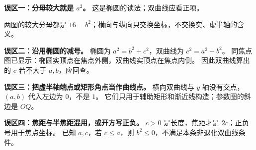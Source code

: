 \begin{trapbox}
\textbf{误区一：分母较大就是 $a^2$。} 这是椭圆的读法；双曲线应看正项。

两图的较大分母都是 $16=b^2$；横向与纵向只交换坐标，不交换实、虚半轴的含义。

\medskip
\textbf{误区二：沿用椭圆的减号。} 椭圆为 $a^2=b^2+c^2$，双曲线为 $c^2=a^2+b^2$。
同焦点图已显示：椭圆实顶点在焦点外侧，双曲线实顶点在焦点内侧。
因此双曲线算出的 $c$ 若不大于 $a,b$，应回查。

\medskip
\textbf{误区三：把虚半轴端点或矩形角点当作曲线点。}
横向双曲线与 $y$ 轴没有交点，$(a,b)$ 代入左边为 $0$，不是 $1$。
它们只用于辅助矩形和渐近线构造；参数图的斜边是 $OQ$。

\medskip
\textbf{误区四：焦距与半焦距混用，或开方写正负。}
$c>0$ 是长度，焦距才是 $2c$；正负号用于焦点坐标。
已知 $a,c$，若 $c\le a$，则 $b^2\le0$，不满足本条非退化双曲线条件。
\end{trapbox}
